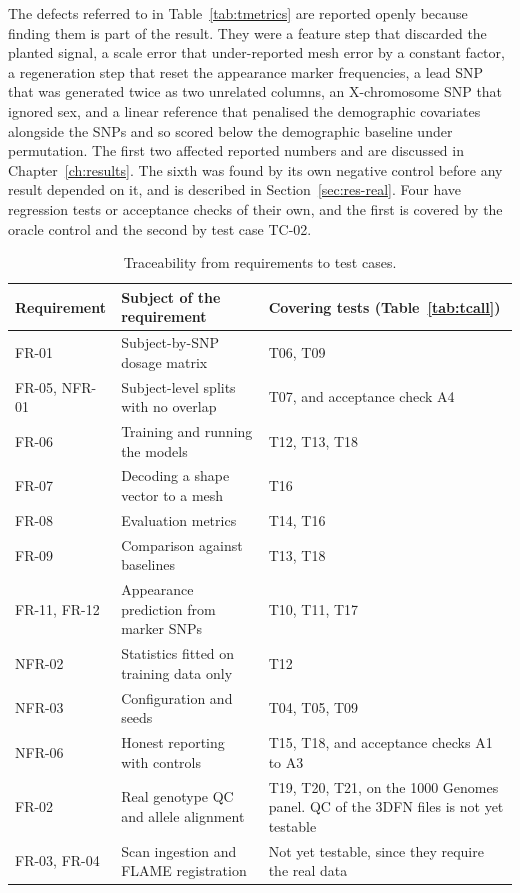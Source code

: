 The defects referred to in Table~\ref{tab:tmetrics} are reported openly because finding them is part of the result. They were a feature step that discarded the planted signal, a scale error that under-reported mesh error by a constant factor, a regeneration step that reset the appearance marker frequencies, a lead SNP that was generated twice as two unrelated columns, an X-chromosome SNP that ignored sex, and a linear reference that penalised the demographic covariates alongside the SNPs and so scored below the demographic baseline under permutation. The first two affected reported numbers and are discussed in Chapter~\ref{ch:results}. The sixth was found by its own negative control before any result depended on it, and is described in Section~\ref{sec:res-real}. Four have regression tests or acceptance checks of their own, and the first is covered by the oracle control and the second by test case TC-02.

\begin{table}[H]
\centering
\caption{Traceability from requirements to test cases.}
\label{tab:ttrace}
\small
\begin{tabular}{|P{2.2cm}|P{6.6cm}|P{5.7cm}|}
\hline
\textbf{Requirement} & \textbf{Subject of the requirement} & \textbf{Covering tests (Table~\ref{tab:tcall})} \\ \hline
FR-01 & Subject-by-SNP dosage matrix & T06, T09 \\ \hline
FR-05, NFR-01 & Subject-level splits with no overlap & T07, and acceptance check A4 \\ \hline
FR-06 & Training and running the models & T12, T13, T18 \\ \hline
FR-07 & Decoding a shape vector to a mesh & T16 \\ \hline
FR-08 & Evaluation metrics & T14, T16 \\ \hline
FR-09 & Comparison against baselines & T13, T18 \\ \hline
FR-11, FR-12 & Appearance prediction from marker SNPs & T10, T11, T17 \\ \hline
NFR-02 & Statistics fitted on training data only & T12 \\ \hline
NFR-03 & Configuration and seeds & T04, T05, T09 \\ \hline
NFR-06 & Honest reporting with controls & T15, T18, and acceptance checks A1 to A3 \\ \hline
FR-02 & Real genotype QC and allele alignment & T19, T20, T21, on the 1000 Genomes panel. QC of the 3DFN files is not yet testable \\ \hline
FR-03, FR-04 & Scan ingestion and FLAME registration & Not yet testable, since they require the real data \\ \hline
\end{tabular}
\end{table}


